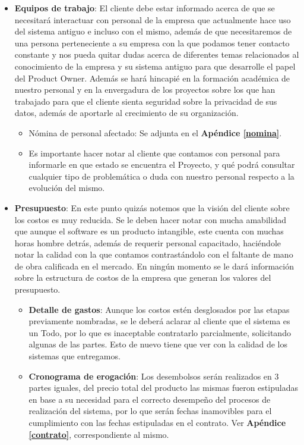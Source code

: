 \begin{itemize}
	\item \textbf{Equipos de trabajo}: El cliente debe estar informado acerca de que se necesitará interactuar con personal de la empresa que actualmente hace uso del sistema antiguo e incluso con el mismo, además de que necesitaremos de una persona perteneciente a su empresa con la que podamos tener contacto constante y nos pueda quitar dudas acerca de diferentes temas relacionados al conocimiento de la empresa y su sistema antiguo para que desarrolle el papel del Product Owner.
Además se hará hincapié en la formación académica de nuestro personal y en la envergadura de los proyectos sobre los que han trabajado para que el cliente sienta seguridad sobre la privacidad de sus datos, además de aportarle al crecimiento de su organización.

	\begin{itemize}
		\item Nómina de personal afectado: Se adjunta en el \textbf{Apéndice \ref{nomina}}.
		\item Es importante hacer notar al cliente que contamos con personal para informarle en que estado se encuentra el Proyecto, y qué podrá consultar cualquier tipo de problemática o duda con nuestro personal respecto a la evolución del mismo.

	\end{itemize} 
 
	\item \textbf{Presupuesto}:
    En este punto quizás notemos que la visión del cliente sobre los costos es muy reducida.
Se le deben hacer notar con mucha amabilidad que aunque el software es un producto intangible, este cuenta con muchas horas hombre detrás, además de requerir personal capacitado, haciéndole notar la calidad con la que contamos contrastándolo con el faltante de mano de obra calificada en el mercado. 
En ningún momento se le dará información sobre la estructura de costos de la empresa que generan los valores del presupuesto.

	\begin{itemize}
		\item \textbf{Detalle de gastos}:
        Aunque los costos estén desglosados por las etapas previamente nombradas, se le deberá aclarar al cliente que el sistema es un Todo, por lo que es inaceptable contratarlo parcialmente, solicitando algunas de las partes.
Esto de nuevo tiene que ver con la calidad de los sistemas que entregamos.

		\item \textbf{Cronograma de erogación}:
        Los desembolsos serán realizados en 3 partes iguales, del precio total del producto las mismas fueron estipuladas en base a su necesidad para el correcto desempeño del procesos de realización del sistema, por lo que serán fechas inamovibles para el cumplimiento con las fechas estipuladas en el contrato.
Ver \textbf{Apéndice \ref{contrato}}, correspondiente al mismo.
	\end{itemize}
    

\end{itemize}
